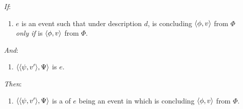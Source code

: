 \begin{note}
  \begin{proposition}
    \label{prop:hinge}


    \begin{itemize}
    \item[\emph{If}:]
      \begin{enumerate}[label=\alph*., ref=(\alph*), series=propHingeSer]
      \item
        \label{prop:hinge:typical}
        \(e\) is an event such that under description \(d\), \vAgent{} is concluding \(\langle \phi, v \rangle\) from \(\Phi\) \emph{only if} \vAgent{} is \vtCV{} \(\langle \phi, v \rangle\) from \(\Phi\).
      \end{enumerate}
    \item[\emph{And}:]
      \begin{enumerate}[label=\alph*., ref=(\alph*), resume*=propHingeSer]
      \item
        \label{prop:hinge:rep}
        \(\langle \langle \psi, v' \rangle, \Psi \rangle\) is \tRep{} \(e\).
      \end{enumerate}
    \item[\emph{Then}:]
      \begin{enumerate}[label=\alph*., ref=(\alph*), resume*=propHingeSer]
      \item
        \label{prop:hinge:requ}
        \(\langle \langle \psi, v' \rangle, \Psi \rangle\) is a \requ{} of \(e\) being an event in which \vAgent{} is concluding \(\langle \phi, v \rangle\) from \(\Phi\).
      \end{enumerate}
    \end{itemize}
    \vspace{-\baselineskip}
  \end{proposition}


\end{note}

